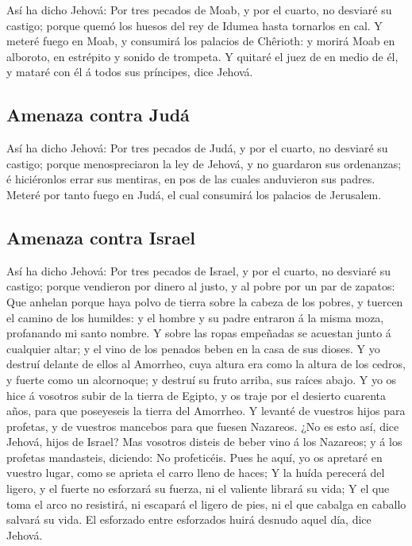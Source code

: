  Así ha dicho Jehová: Por tres pecados de Moab, y por el
cuarto, no desviaré su castigo; porque quemó los huesos del rey de
Idumea hasta tornarlos en cal.  Y meteré fuego en Moab, y
consumirá los palacios de Chêrioth: y morirá Moab en alboroto, en
estrépito y sonido de trompeta.  Y quitaré el juez de en
medio de él, y mataré con él á todos sus príncipes, dice Jehová.

\hypertarget{amenaza-contra-juduxe1}{%
\subsection{Amenaza contra Judá}\label{amenaza-contra-juduxe1}}

 Así ha dicho Jehová: Por tres pecados de Judá, y por el
cuarto, no desviaré su castigo; porque menospreciaron la ley de Jehová,
y no guardaron sus ordenanzas; é hiciéronlos errar sus mentiras, en pos
de las cuales anduvieron sus padres.  Meteré por tanto
fuego en Judá, el cual consumirá los palacios de Jerusalem.

\hypertarget{amenaza-contra-israel}{%
\subsection{Amenaza contra Israel}\label{amenaza-contra-israel}}

 Así ha dicho Jehová: Por tres pecados de Israel, y por el
cuarto, no desviaré su castigo; porque vendieron por dinero al justo, y
al pobre por un par de zapatos:  Que anhelan porque haya
polvo de tierra sobre la cabeza de los pobres, y tuercen el camino de
los humildes: y el hombre y su padre entraron á la misma moza,
profanando mi santo nombre.  Y sobre las ropas empeñadas
se acuestan junto á cualquier altar; y el vino de los penados beben en
la casa de sus dioses.  Y yo destruí delante de ellos al
Amorrheo, cuya altura era como la altura de los cedros, y fuerte como un
alcornoque; y destruí su fruto arriba, sus raíces abajo. 
Y yo os hice á vosotros subir de la tierra de Egipto, y os traje por el
desierto cuarenta años, para que poseyeseis la tierra del Amorrheo.
 Y levanté de vuestros hijos para profetas, y de vuestros
mancebos para que fuesen Nazareos. ¿No es esto así, dice Jehová, hijos
de Israel?  Mas vosotros disteis de beber vino á los
Nazareos; y á los profetas mandasteis, diciendo: No profeticéis.
 Pues he aquí, yo os apretaré en vuestro lugar, como se
aprieta el carro lleno de haces;  Y la huída perecerá del
ligero, y el fuerte no esforzará su fuerza, ni el valiente librará su
vida;  Y el que toma el arco no resistirá, ni escapará el
ligero de pies, ni el que cabalga en caballo salvará su vida.
 El esforzado entre esforzados huirá desnudo aquel día,
dice Jehová.

